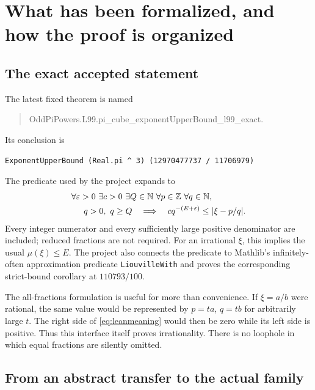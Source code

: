 \section{What has been formalized, and how the proof is organized}
\label{sec:formalization}

\subsection{The exact accepted statement}

The latest fixed theorem is named
\begin{quote}\ttfamily\small
OddPiPowers.L99.\allowbreak pi\_cube\_exponentUpperBound\_l99\_exact.
\end{quote}
Its conclusion is
\begin{verbatim}
ExponentUpperBound (Real.pi ^ 3) (12970477737 / 11706979)
\end{verbatim}
The predicate used by the project expands to
\begin{equation}\label{eq:leanmeaning}
\begin{split}
\forall\varepsilon>0\ \exists c>0\ \exists Q\in\NN\ 
\forall p\in\ZZ\ \forall q\in\NN,\qquad\qquad\\
q>0,\ q\ge Q\quad\Longrightarrow\quad
cq^{-(E+\varepsilon)}\le|\xi-p/q|.
\end{split}
\end{equation}
Every integer numerator and every sufficiently large positive
denominator are included; reduced fractions are not required.
For an irrational \(\xi\), this implies the usual
\(\mu(\xi)\le E\). The project also connects the predicate to
Mathlib's infinitely-often approximation predicate
\texttt{LiouvilleWith} and proves the corresponding strict-bound
corollary at \(110793/100\).

The all-fractions formulation is useful for more than convenience.
If \(\xi=a/b\) were rational, the same value would be represented
by \(p=ta\), \(q=tb\) for arbitrarily large \(t\). The right
side of \eqref{eq:leanmeaning} would then be zero while its left
side is positive. Thus this interface itself proves irrationality.
There is no loophole in which equal fractions are silently omitted.

\subsection{From an abstract transfer to the actual family}

